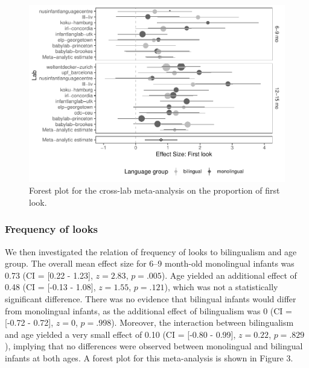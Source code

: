 \documentclass[,man,floatsintext]{apa6}
\begin{document}
\begin{figure}
\centering
\includegraphics{gaze-following-paper_files/figure-latex/fig2-1.pdf}
\caption{\label{fig:fig2}Forest plot for the cross-lab meta-analysis on the proportion of first look.}
\end{figure}

\hypertarget{frequency-of-looks-1}{%
\subsubsection{Frequency of looks}\label{frequency-of-looks-1}}

We then investigated the relation of frequency of looks to bilingualism and age group. The overall mean effect size for 6--9 month-old monolingual infants was 0.73 (CI = {[}0.22 - 1.23{]}, \(z = 2.83\), \(p = .005\)). Age yielded an additional effect of 0.48 (CI = {[}-0.13 - 1.08{]}, \(z = 1.55\), \(p = .121\)), which was not a statistically significant difference. There was no evidence that bilingual infants would differ from monolingual infants, as the additional effect of bilingualism was 0 (CI = {[}-0.72 - 0.72{]}, \(z = 0\), \(p = .998\)). Moreover, the interaction between bilingualism and age yielded a very small effect of 0.10 (CI = {[}-0.80 - 0.99{]}, \(z = 0.22\), \(p = .829\)), implying that no differences were observed between monolingual and bilingual infants at both ages. A forest plot for this meta-analysis is shown in Figure 3.
\end{document}
